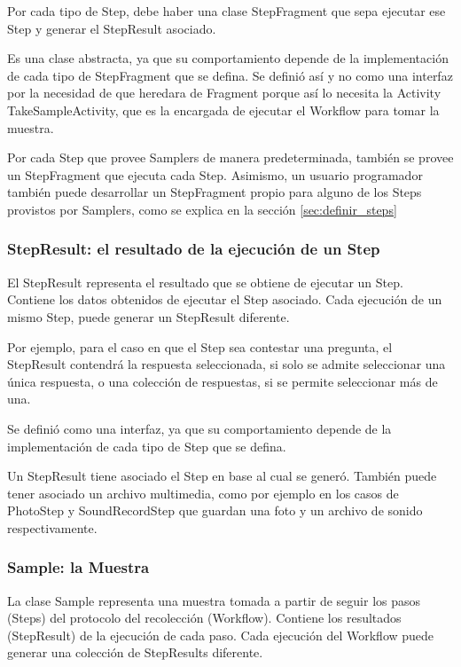 Por cada tipo de Step, debe haber una clase StepFragment que sepa ejecutar ese Step y generar el StepResult asociado.

Es una clase abstracta, ya que su comportamiento depende de la implementación de cada tipo de StepFragment que se defina. Se definió así y no como una interfaz por la necesidad de que heredara de Fragment porque así lo necesita la Activity TakeSampleActivity, que es la encargada de ejecutar el Workflow para tomar la muestra.

Por cada Step que provee Samplers de manera predeterminada, también se provee un StepFragment que ejecuta cada Step. Asimismo, un usuario programador también puede desarrollar un StepFragment propio para alguno de los Steps provistos por Samplers, como se explica en la sección \ref{sec:definir_steps}



\subsubsection{StepResult: el resultado de la ejecución de un Step}
El StepResult representa el resultado que se obtiene de ejecutar un Step. Contiene los datos obtenidos de ejecutar el Step asociado. Cada ejecución de un mismo Step, puede generar un StepResult diferente.

Por ejemplo, para el caso en que el Step sea contestar una pregunta, el StepResult contendrá la respuesta seleccionada, si solo se admite seleccionar una única respuesta, o una colección de respuestas, si se permite seleccionar más de una.

Se definió como una interfaz, ya que su comportamiento depende de la implementación de cada tipo de Step que se defina.

Un StepResult tiene asociado el Step en base al cual se generó. También puede tener asociado un archivo multimedia, como por ejemplo en los casos de PhotoStep y SoundRecordStep que guardan una foto y un archivo de sonido respectivamente.


\subsubsection{Sample: la Muestra}
La clase Sample representa una muestra tomada a partir de seguir los pasos (Steps) del protocolo del recolección (Workflow). Contiene los resultados (StepResult) de la ejecución de cada paso. Cada ejecución del Workflow puede generar una colección de StepResults diferente.

